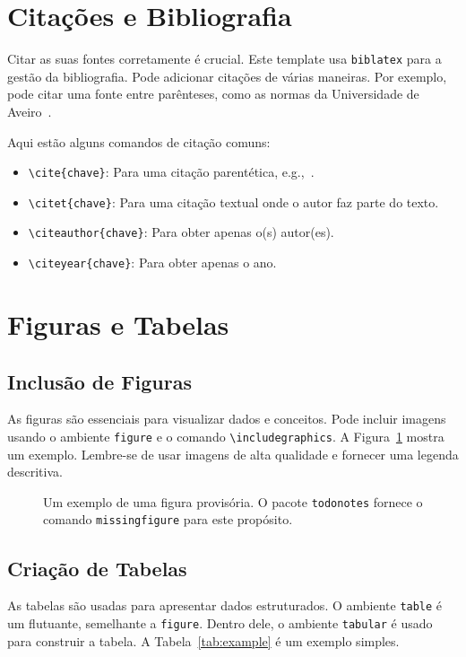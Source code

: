 \section{Citações e Bibliografia}
Citar as suas fontes corretamente é crucial. Este template usa \texttt{biblatex} para a gestão da bibliografia. Pode adicionar citações de várias maneiras. Por exemplo, pode citar uma fonte entre parênteses, como as normas da Universidade de Aveiro~\cite{modelos}.

Aqui estão alguns comandos de citação comuns:
\begin{itemize}
    \item \verb|\cite{chave}|: Para uma citação parentética, e.g.,~\cite{modelos}.
    \item \verb|\citet{chave}|: Para uma citação textual onde o autor faz parte do texto.
    \item \verb|\citeauthor{chave}|: Para obter apenas o(s) autor(es).
    \item \verb|\citeyear{chave}|: Para obter apenas o ano.
\end{itemize}

\section{Figuras e Tabelas}

\subsection{Inclusão de Figuras}
As figuras são essenciais para visualizar dados e conceitos. Pode incluir imagens usando o ambiente \texttt{figure} e o comando \verb|\includegraphics|. A Figura~\ref{fig:placeholder} mostra um exemplo. Lembre-se de usar imagens de alta qualidade e fornecer uma legenda descritiva.

\begin{figure}[H]
    \centering
    \caption{Um exemplo de uma figura provisória. O pacote \texttt{todonotes} fornece o comando \texttt{missingfigure} para este propósito.}
    \label{fig:placeholder}
\end{figure}

\subsection{Criação de Tabelas}
As tabelas são usadas para apresentar dados estruturados. O ambiente \texttt{table} é um flutuante, semelhante a \texttt{figure}. Dentro dele, o ambiente \texttt{tabular} é usado para construir a tabela. A Tabela~\ref{tab:example} é um exemplo simples.

